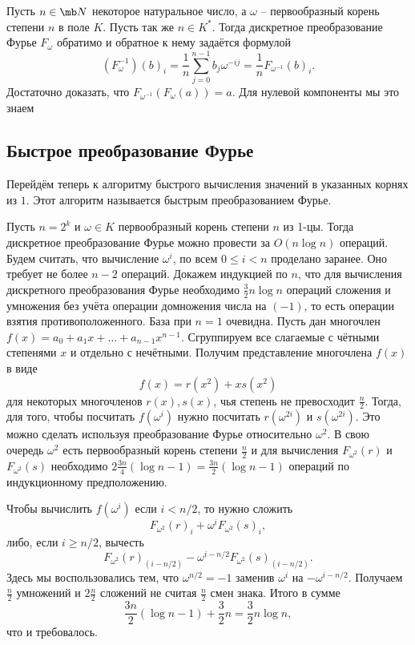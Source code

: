  Пусть $n\in \mb N$ некоторое натуральное число, а $\omega$ -- первообразный корень степени $n$ в поле $K$. Пусть так же $n \in K^*$. Тогда дискретное преобразование Фурье  $F_{\omega}$ обратимо и обратное к нему задаётся формулой $$(F_{\omega}^{-1})(b)_i=\frac{1}{n}\sum_{j=0}^{n-1} b_j \omega^{-ij}=\frac{1}{n} F_{\omega^{-1}}(b)_i.$$
\ethrm
\proof Достаточно доказать, что $F_{\omega^{-1}}(F_{\omega}(a))=a$. Для нулевой компоненты мы это знаем


\endproof

\subsection{Быстрое преобразование Фурье}

Перейдём теперь к алгоритму быстрого вычисления значений в указанных корнях из $1$. Этот алгоритм называется быстрым преобразованием Фурье.

 Пусть $n=2^k$ и $\omega \in K$ первообразный корень степени $n$ из 1-цы. Тогда дискретное преобразование Фурье можно провести за $O(n\log n)$ операций.
\ethrm
\proof  Будем считать, что вычисление $\omega^i$, по всем $0\leq i<n$ проделано заранее. Оно требует не более $n-2$ операций. Докажем индукцией по $n$, что для вычисления дискретного преобразования Фурье необходимо $\frac{3}{2} n\log n$ операций сложения и умножения без учёта операции домножения числа на $(-1)$, то есть операции взятия противоположенного. База при $n=1$ очевидна. Пусть дан многочлен $f(x)=a_0+a_1x+\dots+a_{n-1}x^{n-1}$. Сгруппируем все слагаемые с чётными степенями $x$  и отдельно с нечётными. Получим представление многочлена $f(x)$ в виде 
$$f(x)=r(x^2)+xs(x^2)$$
для некоторых многочленов $r(x), s(x)$, чья степень не превосходит $\frac{n}{2}$. Тогда, для того, чтобы посчитать $f(\omega^i)$ нужно посчитать $r(\omega^{2i})$ и $s(\omega^{2i})$. Это можно сделать используя преобразование Фурье относительно $\omega^2$. В свою очередь $\omega^2$ есть первообразный корень степени $\frac{n}{2}$ и для вычисления $F_{\omega^2}(r)$ и $F_{\omega^2}(s)$ необходимо $2\frac{3n}{4}(\log n -1)=\frac{3n}{2}(\log n -1)$ операций по индукционному предположению.

Чтобы вычислить $f(\omega^i)$  если $i<n/2$, то нужно сложить   $$F_{\omega^2}(r)_i+\omega^{i}F_{\omega^2}(s)_i,$$ либо, если $i\geq n/2$,  вычесть 
$$F_{\omega^2}(r)_{(i-n/2)}-\omega^{i-n/2}F_{\omega^2}(s)_{(i-n/2)}.$$
Здесь мы воспользовались тем, что $\omega^{n/2}=-1$ заменив $\omega^i$ на $-\omega^{i-n/2}$. 
Получаем $\frac{n}{2}$ умножений и $2\frac{n}{2}$ сложений не считая $\frac{n}{2}$ смен знака. Итого в сумме 
$$\frac{3n}{2}(\log n -1) +\frac{3}{2}n=\frac{3}{2}n\log n,$$
что и требовалось.
\endproof


